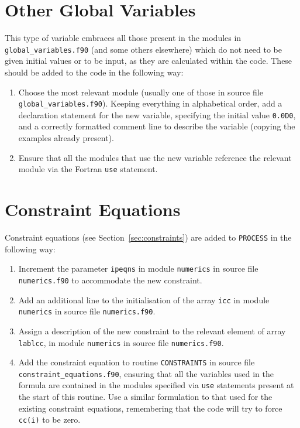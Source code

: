 \documentclass[11pt,a4paper]{report}
\newcommand{\process}{\mbox{\texttt{PROCESS}}}
\begin{document}
\section{Other Global Variables}

This type of variable embraces all those present in the modules in
\texttt{global\_variables.f90} (and some others elsewhere) which do not need
to be given initial values or to be input, as they are calculated within the
code. These should be added to the code in the following way:

\begin{enumerate}

\item Choose the most relevant module (usually one of those in source file
  \texttt{global\_variables.f90}). Keeping everything in alphabetical order,
  add a declaration statement for the new variable, specifying the initial
  value \texttt{0.0D0}, and a correctly formatted comment line to describe the
  variable (copying the examples already present).

\item Ensure that all the modules that use the new variable reference the
  relevant module via the Fortran \texttt{use} statement.

\end{enumerate}

\section{Constraint Equations}

Constraint equations (see Section~\ref{sec:constraints}) are added to
\process\/ in the following way:

\begin{enumerate}

\item Increment the parameter \texttt{ipeqns} in module \texttt{numerics} in
  source file \texttt{numerics.f90} to accommodate the new constraint.

\item Add an additional line to the initialisation of the array \texttt{icc}
  in module \texttt{numerics} in source file \texttt{numerics.f90}.

\item Assign a description of the new constraint to the relevant element of
  array \texttt{lablcc}, in module \texttt{numerics} in source file
  \texttt{numerics.f90}.

\item Add the constraint equation to routine \texttt{CONSTRAINTS} in source
  file \texttt{constraint\_equations.f90}, ensuring that all the variables
  used in the formula are contained in the modules specified via \texttt{use}
  statements present at the start of this routine.  Use a similar formulation
  to that used for the existing constraint equations, remembering that the
  code will try to force \texttt{cc(i)} to be zero.

\end{enumerate}
\end{document}
